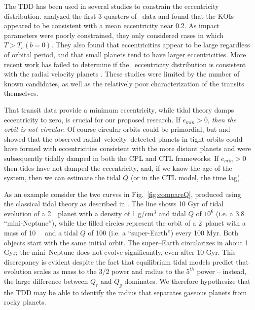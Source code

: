 The TDD has been used in several studies to
constrain the eccentricity distribution. \cite{Moorhead11} analyzed
the first 3 quarters of \kepler~data and found that the KOIs appeared
to be consistent with a mean eccentricity near 0.2. As impact
parameters were poorly constrained, they only considered cases in
which $T > T_c(b=0)$. They also found that eccentricities appear to be
large regardless of orbital period, and that small planets tend to
have larger eccentricities. More recent work has failed to determine
if the \kepler~eccentricity distribution is consistent with the radial
velocity planets \citep{Plavchan12,Kane12}. These studies were limited
by the number of known candidates, as well as the relatively poor
characterization of the transits themselves.

\medskip
{\centerline{}}
\smallskip

That transit data provide a minimum eccentricity, while tidal theory
damps eccentricity to zero, is crucial for our proposed research. If
$e_{min} > 0$, \textit{then the orbit is not circular}.  Of course
circular orbits could be primordial, but \cite{Jackson08}
and \cite{Matsumura10} showed that the observed
radial--velocity--detected planets in tight orbits could have formed
with eccentricities consistent with the more distant planets and were
subsequently tidally damped in both the CPL and CTL frameworks.  If
$e_{min} > 0$ then tides have not damped the eccentricity, and, if we
know the age of the system, then we can estimate the tidal $Q$ (or in
the CTL model, the time lag).

As an example consider the two curves in Fig.~\ref{fig:compareQ}, produced using the classical tidal theory as described in \cite{Barnes13}.  The
line shows 10 Gyr of tidal evolution of a 2~\rearth~planet with a
density of 1 g/cm$^3$ and tidal $Q$ of $10^6$ (i.e. a 3.8~\mearth~
``mini-Neptune''), while the filled circles represent the orbit of a
2~\rearth planet with a mass of 10~\mearth~ and a tidal $Q$ of 100
(i.e. a ``super-Earth'') every 100 Myr.  Both objects start with the
same initial orbit.  The super--Earth circularizes in about 1 Gyr;
the mini--Neptune does not evolve significantly, even after 10 Gyr.
This discrepancy is evident despite the fact that equilibrium tidal
models predict that evolution scales as mass to the 3/2 power and
radius to the $5^{th}$ power -- instead, the large difference between
$Q_r$ and $Q_g$ dominates.  We therefore hypothesize that the TDD may
be able to identify the radius that separates gaseous planets from
rocky planets.

